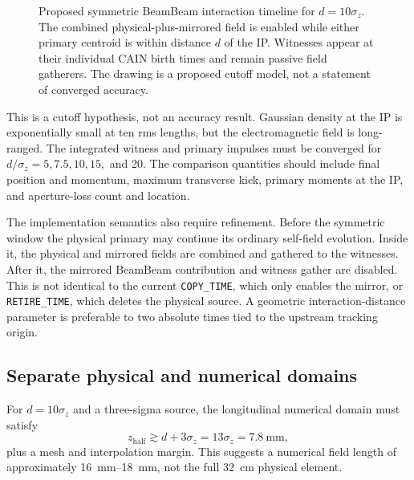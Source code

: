 \documentclass[11pt,a4paper]{article}
\newcommand{\code}[1]{\texttt{#1}}
\begin{document}
\begin{figure}[htbp]
  \caption{Proposed symmetric BeamBeam interaction timeline for
  $d=10\sigma_z$.  The combined physical-plus-mirrored field is enabled while
  either primary centroid is within distance $d$ of the IP.  Witnesses appear
  at their individual CAIN birth times and remain passive field gatherers.  The
  drawing is a proposed cutoff model, not a statement of converged accuracy.}
  \label{fig:intended-timeline}
\end{figure}

This is a cutoff hypothesis, not an accuracy result.  Gaussian density at the
IP is exponentially small at ten rms lengths, but the electromagnetic field is
long-ranged.  The integrated witness and primary impulses must be converged for
$d/\sigma_z=5,7.5,10,15,$ and 20.  The comparison quantities should include
final position and momentum, maximum transverse kick, primary moments at the
IP, and aperture-loss count and location.

The implementation semantics also require refinement.  Before the symmetric
window the physical primary may continue its ordinary self-field evolution.
Inside it, the physical and mirrored fields are combined and gathered to the
witnesses.  After it, the mirrored BeamBeam contribution and witness gather are
disabled.  This is not identical to the current \code{COPY\_TIME}, which only
enables the mirror, or \code{RETIRE\_TIME}, which deletes the physical source.
A geometric interaction-distance parameter is preferable to two absolute
times tied to the upstream tracking origin.

\subsection{Separate physical and numerical domains}

For $d=10\sigma_z$ and a three-sigma source, the longitudinal numerical domain
must satisfy
\begin{equation}
  z_{\mathrm{half}}\gtrsim d+3\sigma_z
  =13\sigma_z=\SI{7.8}{\milli\metre},
\end{equation}
plus a mesh and interpolation margin.  This suggests a numerical field length
of approximately \SIrange{16}{18}{\milli\metre}, not the full
\SI{32}{\centi\metre} physical element.
\end{document}
